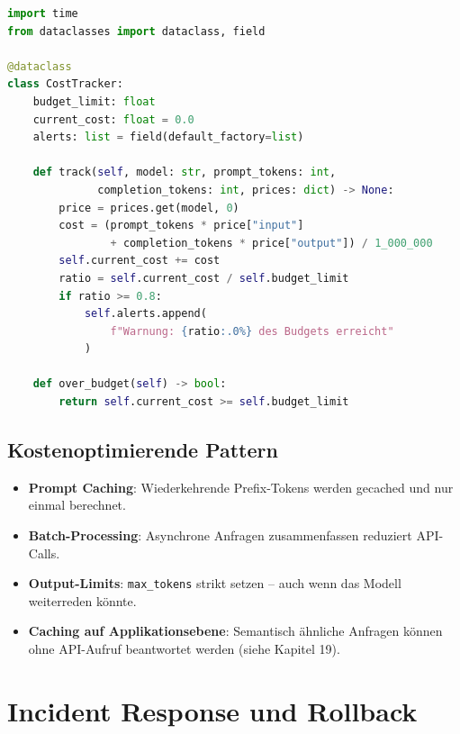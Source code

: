 \begin{lstlisting}[language=Python,caption=Kosten-Tracker für LLM-API-Aufrufe]
import time
from dataclasses import dataclass, field

@dataclass
class CostTracker:
    budget_limit: float
    current_cost: float = 0.0
    alerts: list = field(default_factory=list)

    def track(self, model: str, prompt_tokens: int,
              completion_tokens: int, prices: dict) -> None:
        price = prices.get(model, 0)
        cost = (prompt_tokens * price["input"]
                + completion_tokens * price["output"]) / 1_000_000
        self.current_cost += cost
        ratio = self.current_cost / self.budget_limit
        if ratio >= 0.8:
            self.alerts.append(
                f"Warnung: {ratio:.0%} des Budgets erreicht"
            )

    def over_budget(self) -> bool:
        return self.current_cost >= self.budget_limit
\end{lstlisting}

\subsection{Kostenoptimierende Pattern}

\begin{itemize}[leftmargin=*]
    \item \textbf{Prompt Caching}: Wiederkehrende Prefix-Tokens werden gecached und nur einmal berechnet.
    \item \textbf{Batch-Processing}: Asynchrone Anfragen zusammenfassen reduziert API-Calls.
    \item \textbf{Output-Limits}: \texttt{max\_tokens} strikt setzen -- auch wenn das Modell weiterreden könnte.
    \item \textbf{Caching auf Applikationsebene}: Semantisch ähnliche Anfragen können ohne API-Aufruf beantwortet werden (siehe Kapitel 19).
\end{itemize}


\section{Incident Response und Rollback}

